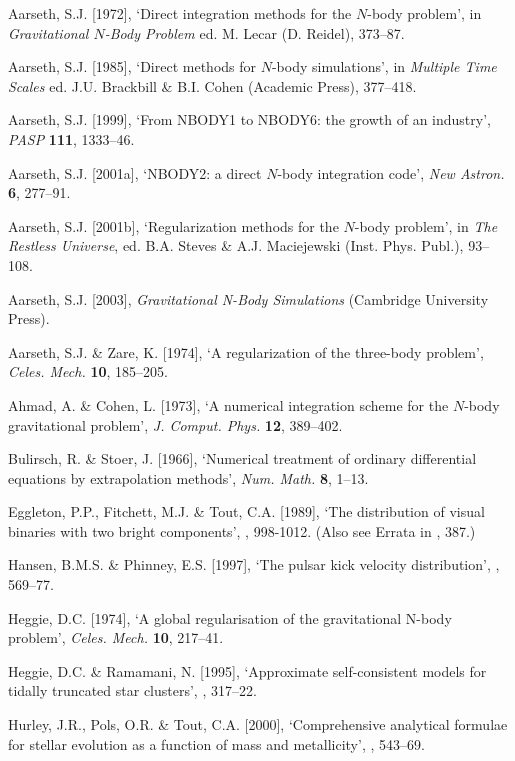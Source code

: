 \documentclass[12pt]{article}
\begin{document}
\medskip
\noindent
Aarseth, S.J. [1972], `Direct integration methods for the $N$-body problem',
in {\it Gravitational $N$-Body Problem} ed. M. Lecar (D. Reidel), 373--87.

\medskip
\noindent
Aarseth, S.J. [1985], `Direct methods for $N$-body simulations',
in {\it Multiple Time Scales} ed. J.U. Brackbill \& B.I. Cohen
(Academic Press), 377--418.

\medskip
\noindent
Aarseth, S.J. [1999], `From NBODY1 to NBODY6: the growth of an industry',
{\it PASP} {\bf 111}, 1333--46.

\medskip
\noindent
Aarseth, S.J. [2001a], `NBODY2: a direct $N$-body integration code',
{\it New Astron.} {\bf 6}, 277--91.

\medskip
\noindent
Aarseth, S.J. [2001b], `Regularization methods for the $N$-body problem',
in {\it The Restless Universe}, ed. B.A. Steves \& A.J. Maciejewski
(Inst. Phys. Publ.), 93--108.

\medskip
\noindent
Aarseth, S.J. [2003], {\it Gravitational N-Body Simulations} (Cambridge University Press).

\medskip
\noindent
Aarseth, S.J. \& Zare, K. [1974], `A regularization of the three-body problem',
{\it Celes. Mech.} {\bf 10}, 185--205.

\medskip
\noindent
Ahmad, A. \& Cohen, L. [1973], `A numerical integration scheme for the $N$-body
gravitational problem', {\it J. Comput. Phys.} {\bf 12}, 389--402.

\medskip
\noindent
Bulirsch, R. \& Stoer, J. [1966], `Numerical treatment of ordinary differential
equations by extrapolation methods',
{\it Num. Math.} {\bf 8}, 1--13.

\medskip
\noindent
Eggleton, P.P., Fitchett, M.J. \& Tout, C.A. [1989], `The distribution of visual
binaries with two bright components',
, 998-1012. (Also see Errata in , 387.)

\medskip
\noindent
Hansen, B.M.S. \& Phinney, E.S. [1997], `The pulsar kick velocity distribution',
, 569--77.

\medskip
\noindent
Heggie, D.C. [1974], `A global regularisation of the gravitational N-body problem',
{\it Celes. Mech.} {\bf 10}, 217--41.

\medskip
\noindent
Heggie, D.C. \& Ramamani, N. [1995], `Approximate self-consistent models for
tidally truncated star clusters',
, 317--22.

\medskip
\noindent
Hurley, J.R., Pols, O.R. \& Tout, C.A. [2000], `Comprehensive analytical formulae
for stellar evolution as a function of mass and metallicity',
, 543--69.
\end{document}
